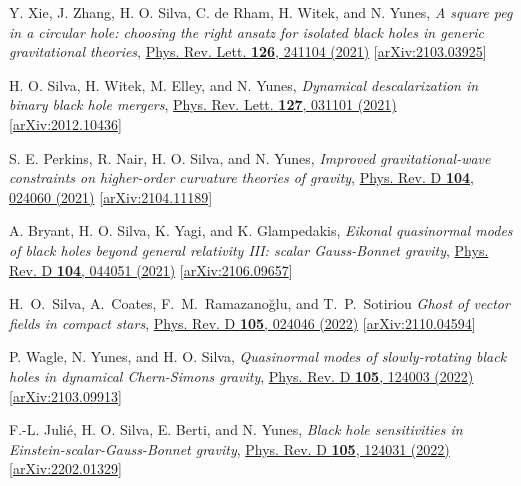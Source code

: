 \documentclass[10pt]{article}
\begin{document}
\begin{bibenum}
    \item Y. Xie, J. Zhang, H. O. Silva, C. de Rham, H. Witek, and N. Yunes,
    \emph{A square peg in a circular hole: choosing the right ansatz for isolated black holes in generic gravitational theories},
    \href{https://journals.aps.org/prl/abstract/10.1103/PhysRevLett.126.241104}{Phys. Rev. Lett. {\bf 126}, 241104 (2021)}
    [\href{https://arxiv.org/abs/2103.03925}{arXiv:2103.03925}]

    \item H. O. Silva, H. Witek, M. Elley, and N. Yunes,
    \emph{Dynamical descalarization in binary black hole mergers},
    \href{https://journals.aps.org/prl/abstract/10.1103/PhysRevLett.127.031101}{Phys. Rev. Lett. {\bf 127}, 031101 (2021)}
    [\href{https://arxiv.org/abs/2012.10436}{arXiv:2012.10436}]

    \item S. E. Perkins, R. Nair, H. O. Silva, and N. Yunes,
    \emph{Improved gravitational-wave constraints on higher-order curvature theories of gravity},
    \href{https://journals.aps.org/prd/abstract/10.1103/PhysRevD.104.024060}{Phys. Rev. D {\bf 104}, 024060 (2021)}
    [\href{https://arxiv.org/abs/2104.11189}{arXiv:2104.11189}]

    \item A. Bryant, H. O. Silva, K. Yagi, and K. Glampedakis,
    \emph{Eikonal quasinormal modes of black holes beyond general relativity III: scalar Gauss-Bonnet gravity},
    \href{https://journals.aps.org/prd/abstract/10.1103/PhysRevD.104.044051}{Phys. Rev. D {\bf 104}, 044051 (2021)}
    [\href{https://arxiv.org/abs/2106.09657}{arXiv:2106.09657}]

    \item H.~O.~Silva, A.~Coates, F.~M.~Ramazano\u{g}lu, and T.~P.~Sotiriou
    \emph{Ghost of vector fields in compact stars},
    \href{https://journals.aps.org/prd/abstract/10.1103/PhysRevD.105.024046}{Phys. Rev. D {\bf 105}, 024046 (2022)}
    [\href{https://arxiv.org/abs/2110.04594}{arXiv:2110.04594}]

    \item P. Wagle, N. Yunes, and H. O. Silva,
    \emph{Quasinormal modes of slowly-rotating black holes in dynamical Chern-Simons gravity},
    \href{https://journals.aps.org/prd/abstract/10.1103/PhysRevD.105.124003}{Phys. Rev. D {\bf 105}, 124003 (2022)}
    [\href{https://arxiv.org/abs/2103.09913}{arXiv:2103.09913}]

    \item F.-L. Juli\'e, H. O. Silva, E. Berti, and N. Yunes,
    \emph{Black hole sensitivities in Einstein-scalar-Gauss-Bonnet gravity},
    \href{https://journals.aps.org/prd/abstract/10.1103/PhysRevD.105.124031}{Phys. Rev. D {\bf 105}, 124031 (2022)}
    [\href{https://arxiv.org/abs/2202.01329}{arXiv:2202.01329}]


\end{bibenum}
\end{document}
